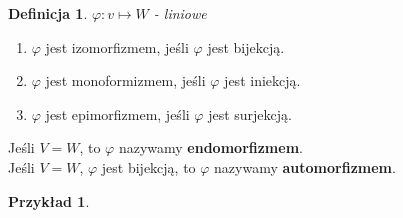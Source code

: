 \documentclass[a5paper,8pt]{article}
\newtheorem{example}{Przykład}[section]
\newtheorem{definition}{Definicja}[section]
\begin{document}
    \begin{definition}
        $ \varphi: v \longmapsto W $ - liniowe
    \end{definition}

    \begin{enumerate}[label=(\alph*)]
        \item
            $\varphi$ jest izomorfizmem, jeśli $\varphi$ jest bijekcją.
        \item
            $\varphi$ jest monoformizmem, jeśli $\varphi$ jest iniekcją.
        \item
            $\varphi$ jest epimorfizmem, jeśli $\varphi$ jest surjekcją.
    \end{enumerate}

    Jeśli $ V = W $, to $ \varphi $ nazywamy \textbf{endomorfizmem}.\\
    Jeśli $ V = W $, $ \varphi $ jest bijekcją, to $ \varphi $ nazywamy
    \textbf{automorfizmem}.

    \begin{example}
    \end{example}
\end{document}
